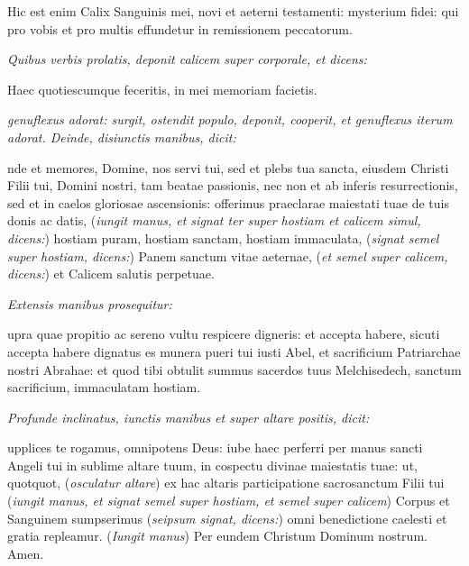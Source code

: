 {
    \Large\centering
    Hic est enim Calix Sanguinis mei, novi et aeterni testamenti: mysterium
    fidei: qui pro vobis et pro multis effundetur in remissionem peccatorum.
    \par
}

\sinus\sinus\sinus

\vspace{\baselineskip}

\textit{Quibus verbis prolatis, deponit calicem super corporale, et dicens:}

\vspace{\baselineskip}

{\Large\centering Haec quotiescumque feceritis, in mei memoriam facietis.\par}

\vspace{\baselineskip}

\textit{%
    genuflexus adorat: surgit, ostendit populo, deponit, cooperit, et genuflexus
    iterum adorat.  Deinde, disiunctis manibus, dicit:
}

nde et memores, Domine, nos servi tui, sed et plebs tua sancta,
eiusdem Christi Filii tui, Domini nostri, tam beatae passionis, nec non et ab
inferis resurrectionis, sed et in caelos gloriosae ascensionis: offerimus
praeclarae maiestati tuae de tuis donis ac datis, (\textit{iungit manus, et
signat ter super hostiam et calicem simul, dicens:}) hostiam \cross{} puram,
hostiam \cross{} sanctam, hostiam \cross{} immaculata, (\textit{signat semel
super hostiam, dicens:}) Panem \cross{} sanctum vitae aeternae, (\textit{et
semel super calicem, dicens:}) et Calicem \cross{} salutis perpetuae.

\textit{Extensis manibus prosequitur:}

upra quae propitio ac sereno vultu respicere digneris: et accepta
habere, sicuti accepta habere dignatus es munera pueri tui iusti Abel, et
sacrificium Patriarchae nostri Abrahae: et quod tibi obtulit summus sacerdos
tuus Melchisedech, sanctum sacrificium, immaculatam hostiam.

\textit{Profunde inclinatus, iunctis manibus et super altare positis, dicit:}

upplices te rogamus, omnipotens Deus: iube haec perferri per manus
sancti Angeli tui in sublime altare tuum, in cospectu divinae maiestatis tuae:
ut, quotquot, (\textit{osculatur altare}) ex hac altaris participatione
sacrosanctum Filii tui (\textit{iungit manus, et signat semel super hostiam, et
semel super calicem}) Cor\cross{}pus et San\cross{}guinem sumpserimus
(\textit{seipsum signat, dicens:}) omni benedictione caelesti et gratia
repleamur.  (\textit{Iungit manus}) Per eundem Christum Dominum nostrum.  Amen.

